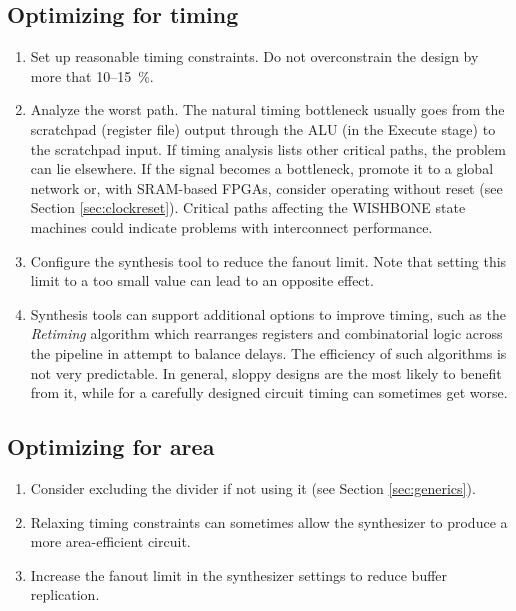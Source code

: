 \documentclass[a4paper,12pt,twoside,extrafontsizes]{memoir}
\begin{document}
\subsection{Optimizing for timing}

\begin{enumerate}
	\item Set up reasonable timing constraints. Do not overconstrain the design by more that 10--15~\%.
	
	\item Analyze the worst path. The natural \lxp{} timing bottleneck usually goes from the scratchpad (register file) output through the ALU (in the Execute stage) to the scratchpad input. If timing analysis lists other critical paths, the problem can lie elsewhere. If the  signal becomes a bottleneck, promote it to a global network or, with SRAM-based FPGAs, consider operating without reset (see Section \ref{sec:clockreset}). Critical paths affecting the WISHBONE state machines could indicate problems with interconnect performance.
	
	\item Configure the synthesis tool to reduce the fanout limit. Note that setting this limit to a too small value can lead to an opposite effect.
	
	\item Synthesis tools can support additional options to improve timing, such as the \emph{Retiming} algorithm which rearranges registers and combinatorial logic across the pipeline in attempt to balance delays. The efficiency of such algorithms is not very predictable. In general, sloppy designs are the most likely to benefit from it, while for a carefully designed circuit timing can sometimes get worse.
\end{enumerate}

\subsection{Optimizing for area}

\begin{enumerate}
	\item Consider excluding the divider if not using it (see Section \ref{sec:generics}).
	
	\item Relaxing timing constraints can sometimes allow the synthesizer to produce a more area-efficient circuit.
	
	\item Increase the fanout limit in the synthesizer settings to reduce buffer replication.
\end{enumerate}
\end{document}
